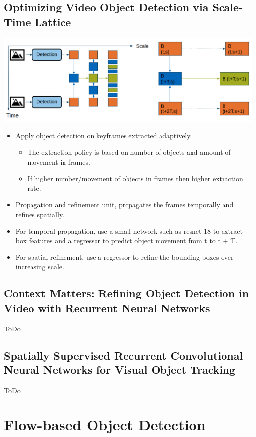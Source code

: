 \documentclass[conference]{IEEEtran}
\begin{document}
\subsection{Optimizing Video Object Detection via Scale-Time Lattice}
\includegraphics[width=\columnwidth]{scale-time-lattice}
\begin{itemize}
	\item Apply object detection on keyframes extracted adaptively.
	\begin{itemize}
		\item The extraction policy is based on number of objects and amount of movement in frames.
		\item If higher number/movement of objects in frames then higher extraction rate.
	\end{itemize}
	\item Propagation and refinement unit, propagates the frames temporally and refines spatially.
	\item For temporal propagation, use a small network such as resnet-18 to extract box features and a regressor to predict object movement from t to t + T.
	\item For spatial refinement, use a regressor to refine the bounding boxes over increasing scale.

\end{itemize}

\subsection{Context Matters: Refining Object Detection in Video with Recurrent Neural Networks}
ToDo

\subsection{Spatially Supervised Recurrent Convolutional Neural Networks for Visual Object Tracking}
ToDo


\section{Flow-based Object Detection}
\end{document}
